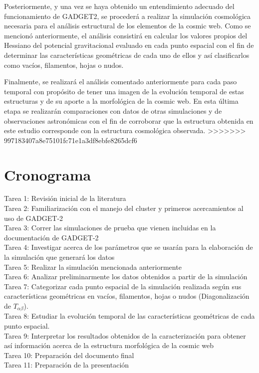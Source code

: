 \documentclass{article}
\begin{document}
Posteriormente, y una vez se haya obtenido un entendimiento adecuado
del funcionamiento de GADGET2, se procederá a realizar la simulación
cosmológica necesaria para el análisis estructural de los elementos de
la cosmic web. Como se mencionó anteriormente, el análisis consistirá
en calcular los valores propios del Hessiano del potencial
gravitacional evaluado en cada punto espacial con el fin de determinar
las características geométricas de cada uno de ellos y así
clasificarlos como vacíos, filamentos, hojas o nudos. 

Finalmente, se realizará el análisis comentado anteriormente para cada
paso temporal con propósito de tener una imagen de la evolución
temporal de estas estructuras y de su aporte a la morfológica de la
cosmic web. En esta última etapa se realizarán comparaciones con datos
de otras simulaciones y de observaciones astronómicas con el fin de
corroborar que la estructura obtenida en este estudio corresponde con
la estructura cosmológica observada.          
>>>>>>> 997183407a8e75101fc71e1a3df8ebfe8265dcf6


\section{Cronograma}

Tarea 1: Revisión inicial de la literatura \\
Tarea 2: Familiarización con el manejo del cluster y primeros acercamientos al uso de GADGET-2 \\
Tarea 3: Correr las simulaciones de prueba que vienen incluidas en la documentación de GADGET-2  \\
Tarea 4: Investigar acerca de los parámetros que se usarán para la elaboración de la simulación que generará los datos \\
Tarea 5: Realizar la simulación mencionada anteriormente \\
Tarea 6: Analizar preliminarmente los datos obtenidos a partir de la simulación \\
Tarea 7: Categorizar cada punto espacial de la simulación realizada según sus características geométricas en vacíos, filamentos, hojas o nudos (Diagonalización de $T_{\alpha\beta}$). \\
Tarea 8: Estudiar la evolución temporal de las características geométricas de cada punto espacial. \\
Tarea 9: Interpretar los resultados obtenidos de la caracterización para obtener así información acerca de la estructura morfológica de la cosmic web \\
Tarea 10: Preparación del documento final \\
Tarea 11: Preparación de la presentación \\
\end{document}
